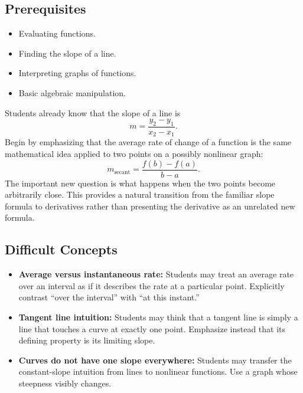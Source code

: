 \documentclass{article}
\begin{document}
\subsection*{Prerequisites}

\begin{itemize}
    \item Evaluating functions.
    \item Finding the slope of a line.
    \item Interpreting graphs of functions.
    \item Basic algebraic manipulation.
\end{itemize}

\begin{tcolorbox}[title=Connecting to Prior Learning]
Students already know that the slope of a line is
\[
m=\frac{y_2-y_1}{x_2-x_1}.
\]
Begin by emphasizing that the average rate of change of a function is the same mathematical idea applied to two points on a possibly nonlinear graph:
\[
m_{\mathrm{secant}}
=
\frac{f(b)-f(a)}{b-a}.
\]
The important new question is what happens when the two points become arbitrarily close. This provides a natural transition from the familiar slope formula to derivatives rather than presenting the derivative as an unrelated new formula.
\end{tcolorbox}

\subsection*{Difficult Concepts}

\begin{itemize}
    \item \textbf{Average versus instantaneous rate:} Students may treat an average rate over an interval as if it describes the rate at a particular point. Explicitly contrast ``over the interval'' with ``at this instant.''
    
    \item \textbf{Tangent line intuition:} Students may think that a tangent line is simply a line that touches a curve at exactly one point. Emphasize instead that its defining property is its limiting slope.
    
    \item \textbf{Curves do not have one slope everywhere:} Students may transfer the constant-slope intuition from lines to nonlinear functions. Use a graph whose steepness visibly changes.
\end{itemize}
\end{document}
